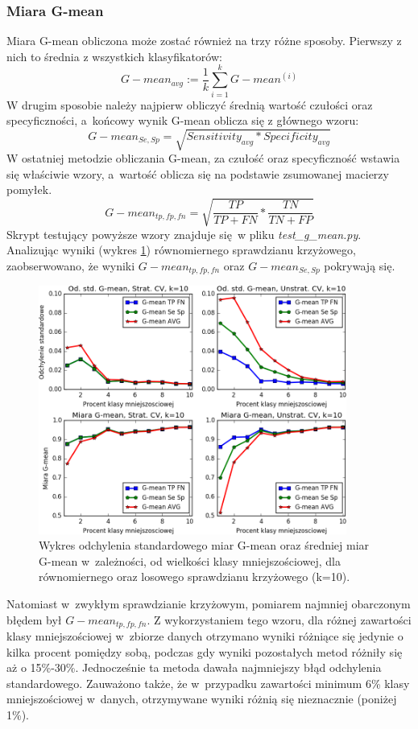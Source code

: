 \subsubsection{Miara G-mean}
Miara G-mean obliczona może zostać również na trzy różne sposoby. Pierwszy z nich to średnia z wszystkich klasyfikatorów:
\[G-mean_{avg} := \frac{1}{k} \sum_{i=1}^{k} G-mean^{(i)} \]
W drugim sposobie należy najpierw obliczyć średnią wartość czułości oraz specyficzności, a~końcowy wynik G-mean oblicza się z głównego wzoru:
\[G-mean_{Se, Sp} = \sqrt{Sensitivity_{avg}*Specificity_{avg}} \]
W ostatniej metodzie obliczania G-mean, za czułość oraz specyficzność wstawia się właściwie wzory, a~wartość oblicza się na podstawie zsumowanej macierzy pomyłek.
\[G-mean_{tp, fp, fn} = \sqrt{\frac{TP}{TP + FN}*\frac{TN}{TN + FP}} \]
Skrypt testujący powyższe wzory znajduje się w pliku \textit{test\_g\_mean.py}. Analizując wyniki (wykres \ref{fig:wykresgmean}) równomiernego sprawdzianu krzyżowego, zaobserwowano, że  wyniki $G-mean_{tp, fp, fn}$ oraz $G-mean_{Se, Sp}$ pokrywają się.
\begin{figure}[H]
	\centering
	\includegraphics[width=0.9\textwidth]{./images/miara-G-mean.png}
	\caption[Odchylenie standardowe oraz średnia miar G-mean dla sprawdzianu krzyżowego]{Wykres odchylenia standardowego miar G-mean oraz średniej miar G-mean w~zależności, od wielkości klasy mniejszościowej, dla równomiernego oraz losowego sprawdzianu krzyżowego (k=10).}
	\label{fig:wykresgmean}
\end{figure}
Natomiast w~zwykłym sprawdzianie krzyżowym, pomiarem najmniej obarczonym błędem był $G-mean_{tp, fp, fn}$. Z wykorzystaniem tego wzoru, dla różnej zawartości klasy mniejszościowej w~zbiorze danych otrzymano wyniki różniące się jedynie o kilka procent pomiędzy sobą, podczas gdy wyniki pozostałych metod różniły się aż o 15\%-30\%. Jednocześnie ta metoda dawała najmniejszy błąd odchylenia standardowego. Zauważono także, że w~przypadku zawartości minimum 6\% klasy mniejszościowej w~danych, otrzymywane wyniki różnią się nieznacznie (poniżej 1\%).

